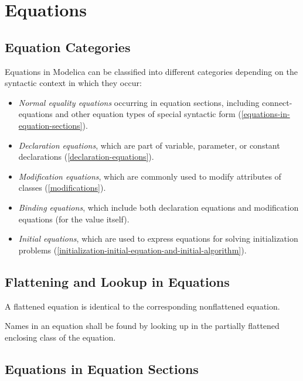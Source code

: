\chapter{Equations}

\section{Equation Categories}

Equations in Modelica can be classified into different categories
depending on the syntactic context in which they occur:

\begin{itemize}
\item
  \emph{Normal equality equations} occurring in equation sections,
  including connect-equations and other equation types of special
  syntactic form (\autoref{equations-in-equation-sections}).
\item
  \emph{Declaration equations}, which are part of variable, parameter,
  or constant declarations (\autoref{declaration-equations}).
\item
  \emph{Modification equations}, which are commonly used to modify
  attributes of classes (\autoref{modifications}).
\item
  \emph{Binding equations}, which include both declaration equations and
  modification equations (for the value itself).
\item
  \emph{Initial equations}, which are used to express equations for
  solving initialization problems (\autoref{initialization-initial-equation-and-initial-algorithm}).
\end{itemize}

\section{Flattening and Lookup in Equations}

A flattened equation is identical to the corresponding nonflattened
equation.

Names in an equation shall be found by looking up in the partially
flattened enclosing class of the equation.

\section{Equations in Equation Sections}

